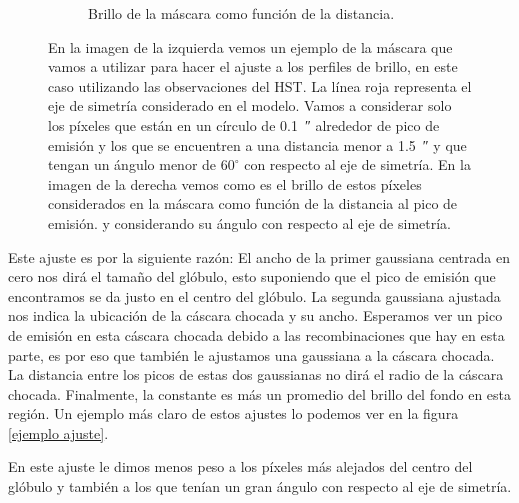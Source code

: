 \documentclass{book}
\begin{document}
\begin{figure}[htb]
\begin{subfigure}[b]{0.5\textwidth}
    \caption{Brillo de la máscara como función de la distancia.}
    \label{fig:f2}
  \end{subfigure}
  \caption{ En la imagen de la izquierda vemos un ejemplo de la máscara que vamos a utilizar para hacer el ajuste a los perfiles de brillo, en este caso utilizando las observaciones del HST. La línea roja representa el eje de simetría considerado en el modelo. Vamos a considerar solo los píxeles que están en un círculo de \SI{0.1}{\arcsecond} alrededor de pico de emisión y los que se encuentren a una distancia menor a \SI{1.5}{\arcsecond} y que tengan un ángulo menor de $60^\circ$ con respecto al eje de simetría. En la imagen de la derecha vemos como es el brillo de estos píxeles considerados en la máscara como función de la distancia al pico de emisión. y considerando su ángulo con respecto al eje de simetría.}
  \label{ejemplo mascara}
\end{figure}

Este ajuste es por la siguiente razón: El ancho de la primer gaussiana centrada en cero nos dirá el tamaño del glóbulo, esto suponiendo que el pico de emisión que encontramos se da justo en el centro del glóbulo. La segunda gaussiana ajustada nos indica la ubicación de la cáscara chocada y su ancho. Esperamos ver un pico de emisión en esta cáscara chocada debido a las recombinaciones que hay en esta parte, es por eso que también le ajustamos una gaussiana a la cáscara chocada. La distancia entre los picos de estas dos gaussianas no dirá el radio de la cáscara chocada. Finalmente, la constante es más un promedio del brillo del fondo en esta región. Un ejemplo más claro de estos ajustes lo podemos ver en la figura \ref{ejemplo ajuste}.

En este ajuste le dimos menos peso a los píxeles más alejados del centro del glóbulo y también a los que tenían un gran ángulo con respecto al eje de simetría.
\end{document}
